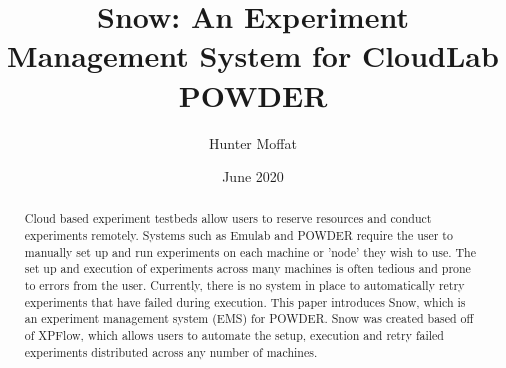 \documentclass[12pt, letterpaper]{article}
\title{Snow: An Experiment Management System for CloudLab POWDER}
\author{Hunter Moffat}
\date{June 2020}
\begin{document}
\maketitle
\begin{multicols}{2}

\begin{abstract}
Cloud based experiment testbeds allow users to reserve resources and conduct experiments remotely.  Systems such as Emulab and POWDER require the user to manually set up and run experiments on each machine or 'node' they wish to use.  The set up and execution of experiments across many machines is often tedious and prone to errors from the user.  Currently, there is no system in place to automatically retry experiments that have failed during execution.  This paper introduces Snow, which is an experiment management system (EMS) for POWDER. Snow was created based off of XPFlow, which allows users to automate the setup, execution and retry failed experiments distributed across any number of machines.    
\end{abstract}

\end{multicols}
\end{document}
